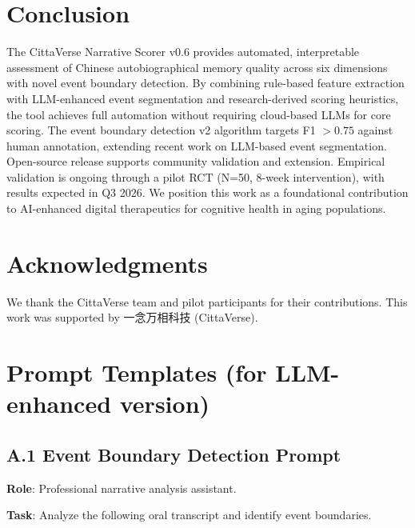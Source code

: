 \documentclass[11pt]{article}
\begin{document}
\section{Conclusion}
\label{sec:conclusion}

The CittaVerse Narrative Scorer v0.6 provides automated, interpretable assessment of Chinese autobiographical memory quality across six dimensions with novel event boundary detection. By combining rule-based feature extraction with LLM-enhanced event segmentation and research-derived scoring heuristics, the tool achieves full automation without requiring cloud-based LLMs for core scoring. The event boundary detection v2 algorithm targets F1 $> 0.75$ against human annotation, extending recent work on LLM-based event segmentation. Open-source release supports community validation and extension. Empirical validation is ongoing through a pilot RCT (N=50, 8-week intervention), with results expected in Q3 2026. We position this work as a foundational contribution to AI-enhanced digital therapeutics for cognitive health in aging populations.

\section*{Acknowledgments}

We thank the CittaVerse team and pilot participants for their contributions. This work was supported by 一念万相科技 (CittaVerse).




\appendix

\section{Prompt Templates (for LLM-enhanced version)}
\label{app:prompts}

\subsection*{A.1 Event Boundary Detection Prompt}

\textbf{Role}: Professional narrative analysis assistant.

\textbf{Task}: Analyze the following oral transcript and identify event boundaries.
\end{document}
